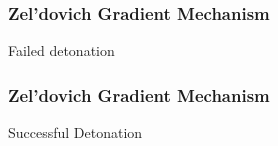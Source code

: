 \documentclass{beamer}
\begin{document}

\begin{frame}
\frametitle{Zel'dovich Gradient Mechanism}
        \vspace{20pt}

        \begin{center}
        \end{center}
        \begin{center}
                Failed detonation
        \end{center}
\end{frame}


\begin{frame}
        \frametitle{Zel'dovich Gradient Mechanism}

        \vspace{20pt}
        \begin{center}

        \caption{Successful Detonation}
        \end{center}

\end{frame}



\end{document}
